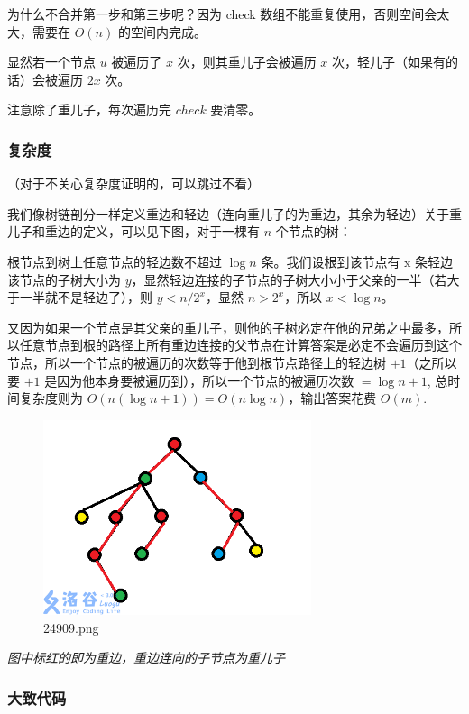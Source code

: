 为什么不合并第一步和第三步呢？因为 check 数组不能重复使用，否则空间会太大，需要在 $O(n)$ 的空间内完成。

显然若一个节点 $u$ 被遍历了 $x$ 次，则其重儿子会被遍历 $x$ 次，轻儿子（如果有的话）会被遍历 $2x$ 次。

注意除了重儿子，每次遍历完 $check$ 要清零。

\subsubsection{复杂度}

（对于不关心复杂度证明的，可以跳过不看）

我们像树链剖分一样定义重边和轻边（连向重儿子的为重边，其余为轻边）关于重儿子和重边的定义，可以见下图，对于一棵有 $n$ 个节点的树：

根节点到树上任意节点的轻边数不超过 $\log n$ 条。我们设根到该节点有 x 条轻边该节点的子树大小为 $y$，显然轻边连接的子节点的子树大小小于父亲的一半（若大于一半就不是轻边了），则 $y<n/2^x$，显然 $n>2^x$，所以 $x<\log n$。

又因为如果一个节点是其父亲的重儿子，则他的子树必定在他的兄弟之中最多，所以任意节点到根的路径上所有重边连接的父节点在计算答案是必定不会遍历到这个节点，所以一个节点的被遍历的次数等于他到根节点路径上的轻边树 $+1$（之所以要 $+1$ 是因为他本身要被遍历到），所以一个节点的被遍历次数 $=\log n+1$, 总时间复杂度则为 $O(n(\log n+1))=O(n\log n)$，输出答案花费 $O(m)$.

\begin{figure}[htbp]
\centering
\includegraphics[width=0.7\textwidth]{docs/misc/images/24909.png} 
\caption{24909.png}
\end{figure} 

 {\em 图中标红的即为重边，重边连向的子节点为重儿子 } 

\subsubsection{大致代码}


